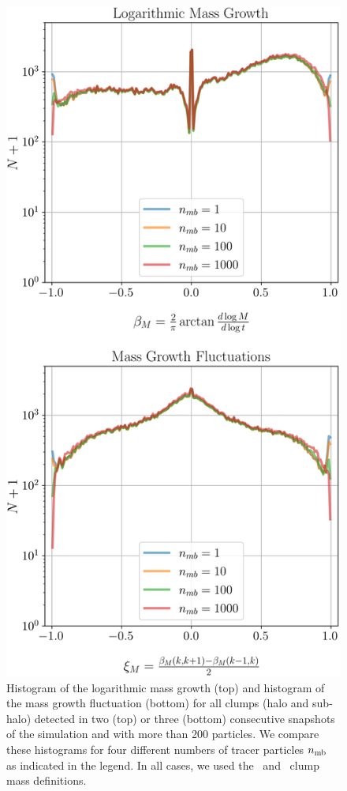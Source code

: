 \begin{figure}
  \centering
  \includegraphics[width=.9\linewidth, keepaspectratio]{images/tree-statistics-my-threshold/mass-statistics-ntrace.png}%
  \caption{ Histogram of the logarithmic mass growth (top) and
    histogram of the mass growth fluctuation (bottom) for all clumps
    (halo and sub-halo) detected in two (top) or three (bottom)
    consecutive snapshots of the simulation and with more than 200
    particles.  We compare these histograms for four different numbers of
    tracer particles $n_{\rm mb}$ as indicated in the legend.  In all
    cases, we used the \exc\ and \sad\ clump mass definitions.
  }%
  \label{fig:ntracers_masses}
\end{figure}

